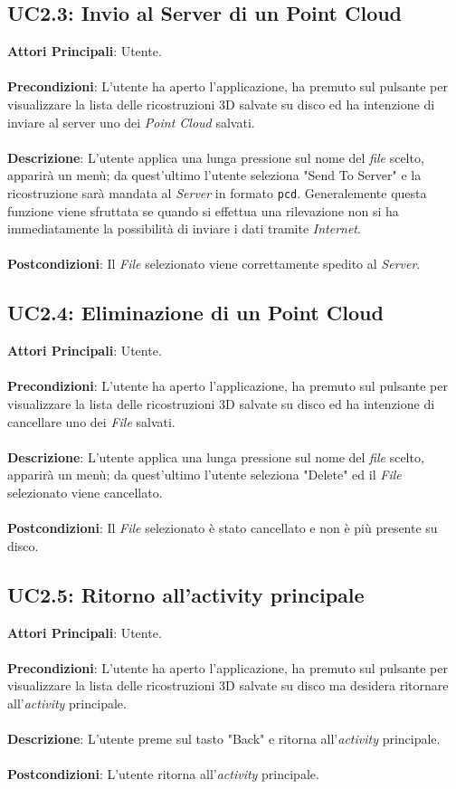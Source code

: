 \subsection{UC2.3: Invio al Server di un Point Cloud}
\textbf{Attori Principali}: Utente.
\\\\ \textbf{Precondizioni}: L'utente ha aperto l'applicazione, ha premuto sul pulsante per visualizzare la lista delle ricostruzioni 3D salvate su disco ed ha intenzione di inviare al server uno dei \emph{Point Cloud} salvati.
\\\\ \textbf{Descrizione}: L'utente applica una lunga pressione sul nome del \emph{file} scelto, apparirà un menù; da quest'ultimo l'utente seleziona "Send To Server" e la ricostruzione sarà mandata al \emph{Server} in formato \texttt{pcd}. Generalemente questa funzione viene sfruttata se quando si effettua una rilevazione non si ha immediatamente la possibilità di inviare i dati tramite \emph{Internet}.
\\\\ \textbf{Postcondizioni}: Il \emph{File} selezionato viene correttamente spedito al \emph{Server}.

\subsection{UC2.4: Eliminazione di un Point Cloud}
\textbf{Attori Principali}: Utente.
\\\\ \textbf{Precondizioni}: L'utente ha aperto l'applicazione, ha premuto sul pulsante per visualizzare la lista delle ricostruzioni 3D salvate su disco ed ha intenzione di cancellare uno dei \emph{File} salvati.
\\\\ \textbf{Descrizione}: L'utente applica una lunga pressione sul nome del \emph{file} scelto, apparirà un menù; da quest'ultimo l'utente seleziona "Delete" ed il \emph{File} selezionato viene cancellato.
\\\\ \textbf{Postcondizioni}: Il \emph{File} selezionato è stato cancellato e non è più presente su disco.

\subsection{UC2.5: Ritorno all'activity principale}
\textbf{Attori Principali}: Utente.
\\\\ \textbf{Precondizioni}: L'utente ha aperto l'applicazione, ha premuto sul pulsante per visualizzare la lista delle ricostruzioni 3D salvate su disco ma desidera ritornare all'\emph{activity} principale.
\\\\ \textbf{Descrizione}: L'utente preme sul tasto "Back" e ritorna all'\emph{activity} principale.
\\\\ \textbf{Postcondizioni}: L'utente ritorna all'\emph{activity} principale.


